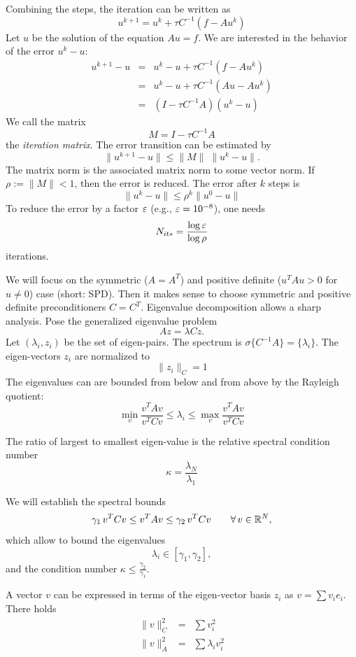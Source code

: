 Combining the steps, the iteration can be written as
$$
u^{k+1} = u^k + \tau C^{-1} (f - A u^k)
$$
Let $u$ be the solution of the equation $A u = f$. 
We are interested in the behavior of the error $u^k - u$:
\begin{eqnarray*}
u^{k+1} - u & = & u^k - u + \tau C^{-1} (f - A u^k) \\
        & = & u^k - u + \tau C^{-1} (A u - A u^k) \\
        & = & (I - \tau C^{-1} A ) (u^k - u)
\end{eqnarray*}
We call the matrix 
$$
M = I - \tau C^{-1} A
$$
the {\it iteration matrix}. The error transition can be 
estimated by
$$
\| u^{k+1} - u \| \leq \| M \| \; \| u^k - u \|.
$$
The matrix norm is the associated matrix norm to some vector norm.
If $\rho := \| M \| < 1$, then the error is reduced. The error
after $k$ steps is
$$
\| u^k - u \| \leq \rho^k \| u^0 - u \|
$$
To reduce the error by a factor $\varepsilon$ (e.g., $\varepsilon = 10^{-8}$), one
needs
$$
N_{its} = \frac{\log \varepsilon}{\log \rho}
$$
iterations.

We will focus on the symmetric ($A = A^T$) and positive definite ($u^T
A u > 0$ for $u \neq 0$) case (short: SPD). Then it makes sense to choose
symmetric and positive definite preconditioners $C = C^T$. Eigenvalue
decomposition allows a sharp analysis. Pose the generalized eigenvalue
problem
%
$$
A z = \lambda C z. 
$$
Let $(\lambda_i, z_i)$ be the set of eigen-pairs. The spectrum is $\sigma\{C^{-1} A\} = \{ \lambda_i \}$. The eigen-vectors $z_i$ are normalized to 
$$
\| z_i \|_C = 1
$$
The eigenvalues can are bounded from below and from above by the
Rayleigh quotient:
$$
\min_{v} \frac{v^T A v}{v^T C v} \leq \lambda_i \leq 
\max_{v} \frac{v^T A v}{v^T C v} 
$$ 

The ratio of largest to smallest eigen-value is the relative spectral 
condition number
$$
\kappa = \frac{\lambda_N}{\lambda_1}
$$

We will establish the spectral bounds
$$
\gamma_1 \, v^T C v \leq v^T A v \leq \gamma_2 \, v^T C v \qquad \forall \, v \in {\mathbb R}^N,
$$
which allow to bound the eigenvalues
$$
\lambda_i \in [ \gamma_1, \gamma_2],
$$
and the condition number $\kappa \leq \frac{\gamma_2}{\gamma_1}$.


A vector $v$ can be expressed in terms of the eigen-vector basis $z_i$
as $v = \sum v_i e_i$. There holds
\begin{eqnarray*}
\| v \|_C^2 & = & \sum v_i^2 \\
\| v \|_A^2 & = & \sum \lambda_i v_i^2 
\end{eqnarray*}

